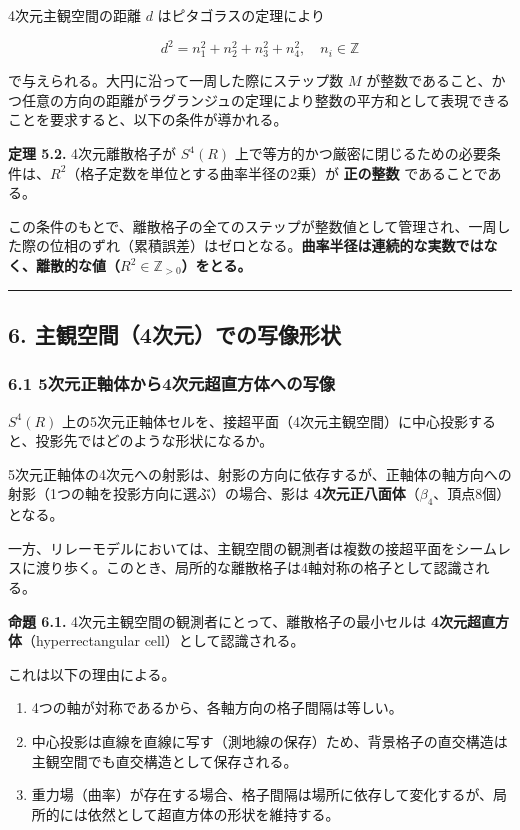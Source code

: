 \documentclass[a4paper,11pt]{ltjsarticle}
\providecommand{\tightlist}{\setlength{\itemsep}{0pt}\setlength{\parskip}{0pt}}
\begin{document}
4次元主観空間の距離 \(d\) はピタゴラスの定理により

\[d^2 = n_1^2 + n_2^2 + n_3^2 + n_4^2, \quad n_i \in \mathbb{Z}\]

で与えられる。大円に沿って一周した際にステップ数 \(M\)
が整数であること、かつ任意の方向の距離がラグランジュの定理により整数の平方和として表現できることを要求すると、以下の条件が導かれる。

\textbf{定理 5.2.} 4次元離散格子が \(S^4(R)\)
上で等方的かつ厳密に閉じるための必要条件は、\(R^2\)（格子定数を単位とする曲率半径の2乗）が
\textbf{正の整数} であることである。

この条件のもとで、離散格子の全てのステップが整数値として管理され、一周した際の位相のずれ（累積誤差）はゼロとなる。\textbf{曲率半径は連続的な実数ではなく、離散的な値（\(R^2 \in \mathbb{Z}_{>0}\)）をとる。}

\begin{center}\rule{0.5\linewidth}{0.5pt}\end{center}

\subsection{6.
主観空間（4次元）での写像形状}\label{ux4e3bux89b3ux7a7aux95934ux6b21ux5143ux3067ux306eux5199ux50cfux5f62ux72b6}

\subsubsection{6.1
5次元正軸体から4次元超直方体への写像}\label{ux6b21ux5143ux6b63ux8ef8ux4f53ux304bux30894ux6b21ux5143ux8d85ux76f4ux65b9ux4f53ux3078ux306eux5199ux50cf}

\(S^4(R)\)
上の5次元正軸体セルを、接超平面（4次元主観空間）に中心投影すると、投影先ではどのような形状になるか。

5次元正軸体の4次元への射影は、射影の方向に依存するが、正軸体の軸方向への射影（1つの軸を投影方向に選ぶ）の場合、影は
\textbf{4次元正八面体}（\(\beta_4\)、頂点8個）となる。

一方、リレーモデルにおいては、主観空間の観測者は複数の接超平面をシームレスに渡り歩く。このとき、局所的な離散格子は4軸対称の格子として認識される。

\textbf{命題 6.1.} 4次元主観空間の観測者にとって、離散格子の最小セルは
\textbf{4次元超直方体}（hyperrectangular cell）として認識される。

これは以下の理由による。

\begin{enumerate}
\def\labelenumi{\arabic{enumi}.}
\tightlist
\item
  4つの軸が対称であるから、各軸方向の格子間隔は等しい。
\item
  中心投影は直線を直線に写す（測地線の保存）ため、背景格子の直交構造は主観空間でも直交構造として保存される。
\item
  重力場（曲率）が存在する場合、格子間隔は場所に依存して変化するが、局所的には依然として超直方体の形状を維持する。
\end{enumerate}
\end{document}
